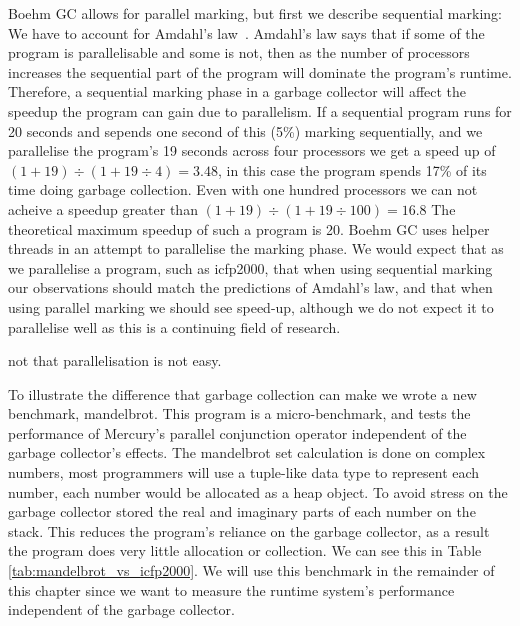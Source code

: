 Boehm GC allows for parallel marking,
but first we describe sequential marking:
We have to account for Amdahl's law~\citep{amdahl}.
Amdahl's law says that if some of the program is parallelisable and some
is not,
then as the number of processors increases the sequential part of the
program will dominate the program's runtime.
Therefore,
a sequential marking phase in a garbage collector will affect the speedup
the program can gain due to parallelism.
If a sequential program runs for 20 seconds and sepends one second of this
(5\%) marking sequentially,
and we parallelise the program's 19 seconds across four processors we get
a speed up of
$(1 + 19) \div (1 + 19\div4) = 3.48$,
in this case the program spends 17\% of its time doing garbage collection.
Even with one hundred processors we can not acheive a speedup greater than
$(1 + 19) \div (1 + 19\div100) = 16.8$
The theoretical maximum speedup of such a program is 20.
Boehm GC uses helper threads in an attempt to parallelise the marking phase.
We would expect that as we parallelise a program,
such as icfp2000,
that when using sequential marking our observations should match the
predictions of Amdahl's law,
and that when using parallel marking we should see speed-up,
although we do not expect it to parallelise well
as this is a continuing field of research.


not that parallelisation is not easy.





To illustrate the difference that garbage collection can make we wrote a new
benchmark, mandelbrot.
This program is a micro-benchmark, and tests the performance of 
Mercury's parallel conjunction operator independent of the garbage
collector's effects.
The mandelbrot set calculation is done on complex numbers,
most programmers will use a tuple-like data type to represent each number,
each number would be allocated as a heap object.
To avoid stress on the garbage collector stored the real and imaginary parts
of each number on the stack.
This reduces the program's reliance on the garbage collector,
as a result the program does very little allocation or collection.
We can see this in Table \ref{tab:mandelbrot_vs_icfp2000}.
We will use this benchmark in the remainder of this chapter since we want to
measure the runtime system's performance independent of the garbage collector.

